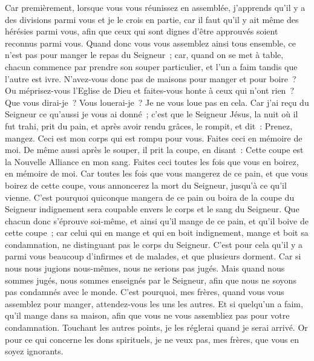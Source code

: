 \begin{multicols}{2}
Car premièrement, lorsque vous vous réunissez en assemblée, j'apprends qu'il y a des divisions parmi vous et je le crois en partie,
car il faut qu'il y ait même des hérésies parmi vous, afin que ceux qui sont dignes d'être approuvés soient reconnus parmi vous.
Quand donc vous vous assemblez ainsi tous ensemble, ce n'est pas pour manger le repas du Seigneur~;
car, quand on se met à table, chacun commence par prendre son souper particulier, et l'un a faim tandis que l'autre est ivre.
N'avez-vous donc pas de maisons pour manger et pour boire~? Ou méprisez-vous l'Eglise de Dieu et faites-vous honte à ceux qui n'ont rien~? Que vous dirai-je~? Vous louerai-je~? Je ne vous loue pas en cela.
Car j'ai reçu du Seigneur ce qu'aussi je vous ai donné~; c'est que le Seigneur Jésus, la nuit où il fut trahi, prit du pain,
et après avoir rendu grâces, le rompit, et dit~: Prenez, mangez. Ceci est mon corps qui est rompu pour vous. Faites ceci en mémoire de moi.
De même aussi après le souper, il prit la coupe, en disant~: Cette coupe est la Nouvelle Alliance en mon sang. Faites ceci toutes les fois que vous en boirez, en mémoire de moi.
Car toutes les fois que vous mangerez de ce pain, et que vous boirez de cette coupe, vous annoncerez la mort du Seigneur, jusqu'à ce qu'il vienne.
C'est pourquoi quiconque mangera de ce pain ou boira de la coupe du Seigneur indignement sera coupable envers le corps et le sang du Seigneur.
Que chacun donc s'éprouve soi-même, et ainsi qu'il mange de ce pain, et qu'il boive de cette coupe~;
car celui qui en mange et qui en boit indignement, mange et boit sa condamnation, ne distinguant pas le corps du Seigneur.
C'est pour cela qu'il y a parmi vous beaucoup d'infirmes et de malades, et que plusieurs dorment.
Car si nous nous jugions nous-mêmes, nous ne serions pas jugés.
Mais quand nous sommes jugés, nous sommes enseignés par le Seigneur, afin que nous ne soyons pas condamnés avec le monde.
C'est pourquoi, mes frères, quand vous vous assemblez pour manger, attendez-vous les uns les autres.
Et si quelqu'un a faim, qu'il mange dans sa maison, afin que vous ne vous assembliez pas pour votre condamnation. Touchant les autres points, je les réglerai quand je serai arrivé.
\VerseOne{}Or pour ce qui concerne les dons spirituels, je ne veux pas, mes frères, que vous en soyez ignorants.

\end{multicols}
